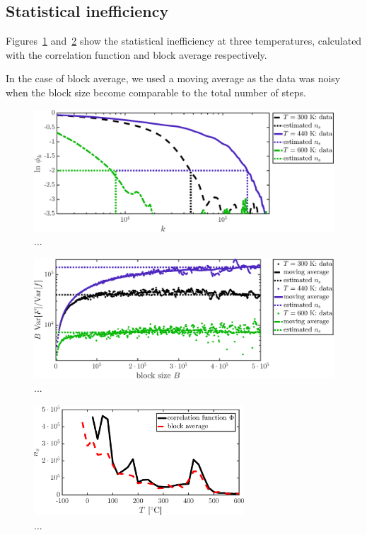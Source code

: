 \subsection{Statistical inefficiency}
Figures~\ref{fig:ns_phi} and~\ref{fig:ns_block} show the statistical inefficiency at three temperatures, calculated with the correlation function and block average respectively. 

In the case of block average, we used a moving average as the data was noisy when the block size become comparable to the total number of steps. 

\begin{figure}[!ht]
\begin{center}
  \includegraphics[width=\textwidth]{../figures/stat_inefficiency_Phi} 
  \caption{... }
  \label{fig:ns_phi}
\end{center}
\end{figure}

\begin{figure}[!ht]
\begin{center}
  \includegraphics[width=\textwidth]{../figures/stat_inefficiency_block} 
  \caption{... }
  \label{fig:ns_block}
\end{center}
\end{figure}

\begin{figure}[!ht]
\begin{center}
  \includegraphics[width=0.7\textwidth]{../figures/stat_inefficiency_both} 
  \caption{... }
  \label{fig:ns_both}
\end{center}
\end{figure}
